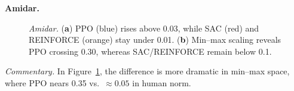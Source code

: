 \noindent \textbf{Amidar.}
\begin{figure} 
	\centering
	\quad
	\caption{\emph{Amidar.}
		(\textbf{a}) PPO (blue) rises above 0.03, while SAC (red) and REINFORCE (orange) stay under 0.01. 
		(\textbf{b}) Min--max scaling reveals PPO crossing 0.30, whereas SAC/REINFORCE remain below 0.1.}
	\label{fig:amidar_combined}
\end{figure}

\noindent
\emph{Commentary.} In Figure~\ref{fig:amidar_combined}, the difference is more dramatic in min--max space, where PPO nears 0.35 vs.\ \(\approx0.05\) in human norm.

\medskip

